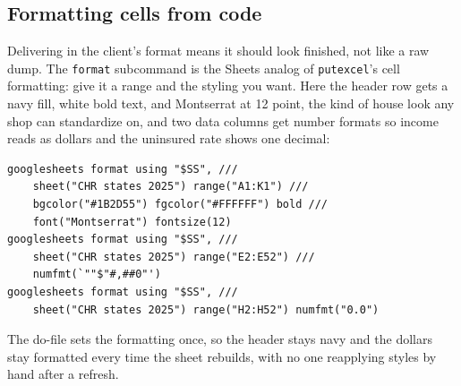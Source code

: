 \documentclass[
    a4paper,
    fontsize=10pt,
    twoside=true,
    numbers=noenddot,
]{kaobook}
\begin{document}
\subsection{Formatting cells from code}
Delivering in the client's format means it should look finished, not like a raw dump. The \texttt{format} subcommand is the Sheets analog of \texttt{putexcel}'s cell formatting: give it a range and the styling you want. Here the header row gets a navy fill, white bold text, and Montserrat at 12 point, the kind of house look any shop can standardize on, and two data columns get number formats so income reads as dollars and the uninsured rate shows one decimal:
\par
{\footnotesize
\begin{verbatim}
googlesheets format using "$SS", ///
    sheet("CHR states 2025") range("A1:K1") ///
    bgcolor("#1B2D55") fgcolor("#FFFFFF") bold ///
    font("Montserrat") fontsize(12)
googlesheets format using "$SS", ///
    sheet("CHR states 2025") range("E2:E52") ///
    numfmt(`""$"#,##0"')
googlesheets format using "$SS", ///
    sheet("CHR states 2025") range("H2:H52") numfmt("0.0")
\end{verbatim}
}
The do-file sets the formatting once, so the header stays navy and the dollars stay formatted every time the sheet rebuilds, with no one reapplying styles by hand after a refresh.
\end{document}
